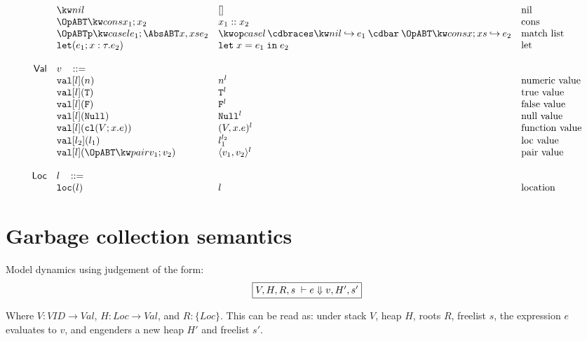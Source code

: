 \documentclass[11pt]{article}
\newcommand{\ms}[1]{\ensuremath{\mathsf{#1}}}
\newcommand{\irl}[1]{\mathtt{#1}}
\begin{document}
\[\begin{array}{r l l l l}
 	& \nilexabt					& []   										& \text{nil}\\
 	& \consexabt{x_1}{x_2}					& x_1::x_2   										& \text{cons}\\
 	& \listcaseexabt{l}{e_1}{x}{xs}{e_2}					& \listcaseexcst{l}{e_1}{x}{xs}{e_2}   	& \text{match list}\\
  & \irl{let}(e_1; x : \tau.e_2)			& \irl{let}\; x = e_1 \; \irl{in}\; e_2   	& \text{let}\\
  \\
\ms{Val}
        & v   \,\,\,\,\, ::= \\
 	& \irl{val}[l](n)                                			& n^l 												& \text{numeric value}\\
 	& \irl{val}[l](\irl{T})                               			& \irl{T}^l 								  & \text{true value}\\
 	& \irl{val}[l](\irl{F})                                			& \irl{F}^l								  & \text{false value}\\
 	& \irl{val}[l](\irl{Null})                                  & \irl{Null}^l 								  & \text{null value}\\
 	& \irl{val}[l](\irl{cl}(V; x.e))                & (V, x.e)^l 					& \text{function value}\\
 	& \irl{val}[l_2](l_1)                                			& l_1^{l_2} 								  & \text{loc value}\\
 	& \irl{val}[l](\pairexabt{v_1}{v_2})                             & \pairexcst{v_1}{v_2}^l 								  & \text{pair value}\\
  \\
\ms{Loc}
        & l   \,\,\,\,\, ::= \\
 	& \irl{loc}(l)                                			& l 												& \text{location}\\
\end{array}
\]

\section{Garbage collection semantics}

Model dynamics using judgement of the form:
\[
\fbox{$V,H,R,s \; \vdash e \Downarrow v, H', s'$}
\]

Where $V : VID \to Val$, $H : Loc \to Val$, and $R : \{Loc\}$. This can be read as: under stack $V$, heap $H$, roots $R$,
freelist $s$, the expression $e$ evaluates to $v$, and engenders a new heap $H'$ and freelist $s'$.\\
\end{document}

